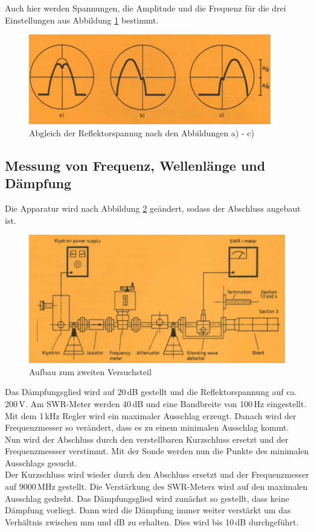     Auch hier werden Spannungen, die Amplitude und die Frequenz für die drei Einstellungen aus Abbildung \ref{fig:Mode2}
    bestimmt.
    \begin{figure}
      \centering
      \includegraphics[scale = 0.8]{pictures/Mode2.png}
      \caption{Abgleich der Reflektorspannug nach den Abbildungen a) - c)\cite{anleitung}}
      \label{fig:Mode2}
    \end{figure}

    \subsection{Messung von Frequenz, Wellenlänge und Dämpfung}
    Die Apparatur wird nach Abbildung \ref{fig:aufbauv2} geändert, sodass der Abschluss angebaut ist.
    \begin{figure}
      \centering
      \includegraphics[scale=0.8]{pictures/AufbauV2.png}
      \caption{Aufbau zum zweiten Versuchsteil\cite{anleitung}}
      \label{fig:aufbauv2}
    \end{figure}
    Das Dämpfungsglied wird auf 20\,dB gestellt und die Reflektorspannung auf ca. 200\,V.
    Am SWR-Meter werden 40\,dB und eine Bandbreite von 100\,Hz eingestellt.
    Mit dem 1\,kHz Regler wird ein maximaler Ausschlag erzeugt.
    Danach wird der Frequenzmesser so verändert, dass es zu einem minimalen Ausschlag kommt.\\
    Nun wird der Abschluss durch den verstellbaren Kurzschluss ersetzt und der Frequenzmessser verstimmt.
    Mit der Sonde werden nun die Punkte des minimalen Ausschlags gesucht.\\
    Der Kurzschluss wird wieder durch den Abschluss ersetzt und der Frequenzmesser auf 9000\,MHz gestellt.
    Die Verstärkung des SWR-Meters wird auf den maximalen Ausschlag gedreht.
    Das Dämpfungsglied wird zunächst so gestellt, dass keine Dämpfung vorliegt.
    Dann wird die Dämpfung immer weiter verstärkt um das Verhältnis zwischen mm und dB zu erhalten.
    Dies wird bis 10\,dB durchgeführt.

